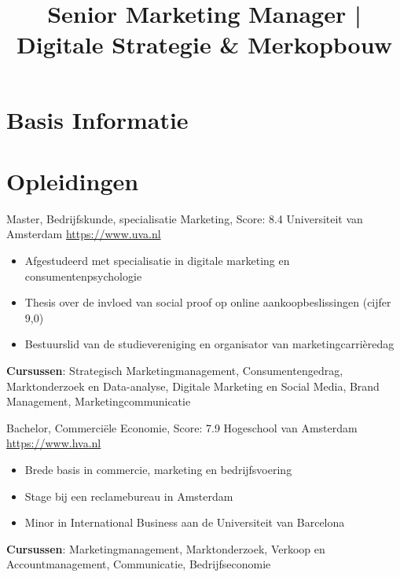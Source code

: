 \documentclass[a4paper, serif, 10pt]{moderncv}
\title{Senior Marketing Manager | Digitale Strategie \& Merkopbouw}
\begin{document}
\maketitle

\section{Basis Informatie}

\section{Opleidingen}

        {Master, Bedrijfskunde, specialisatie Marketing, Score: 8.4}
        {Universiteit van Amsterdam}
        {\url{https://www.uva.nl}}
        {}
        {\begin{itemize}
\item Afgestudeerd met specialisatie in digitale marketing en consumentenpsychologie
\item Thesis over de invloed van social proof op online aankoopbeslissingen (cijfer 9,0)
\item Bestuurslid van de studievereniging en organisator van marketingcarrièredag
\end{itemize}
\textbf{Cursussen}: Strategisch Marketingmanagement, Consumentengedrag, Marktonderzoek en Data-analyse, Digitale Marketing en Social Media, Brand Management, Marketingcommunicatie}

        {Bachelor, Commerciële Economie, Score: 7.9}
        {Hogeschool van Amsterdam}
        {\url{https://www.hva.nl}}
        {}
        {\begin{itemize}
\item Brede basis in commercie, marketing en bedrijfsvoering
\item Stage bij een reclamebureau in Amsterdam
\item Minor in International Business aan de Universiteit van Barcelona
\end{itemize}
\textbf{Cursussen}: Marketingmanagement, Marktonderzoek, Verkoop en Accountmanagement, Communicatie, Bedrijfseconomie}
\end{document}
